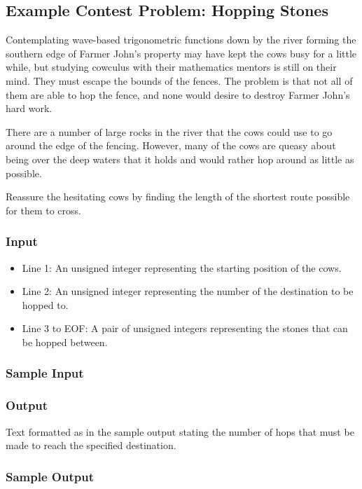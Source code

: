 \subsection{Example Contest Problem: Hopping Stones}

Contemplating wave-based trigonometric functions down by the river forming the southern edge of Farmer John's property may have kept the cows busy for a little while, but studying cowculus with their mathematics mentors is still on their mind.
They must escape the bounds of the fences.
The problem is that not all of them are able to hop the fence, and none would desire to destroy Farmer John's hard work.

There are a number of large rocks in the river that the cows could use to go around the edge of the fencing.
However, many of the cows are queasy about being over the deep waters that it holds and would rather hop around as little as possible.

Reassure the hesitating cows by finding the length of the shortest route possible for them to cross.

\subsubsection{Input}
\begin{itemize}
	\item Line 1: An unsigned integer representing the starting position of the cows.
	\item Line 2: An unsigned integer representing the number of the destination to be hopped to.
	\item Line 3 to EOF: A pair of unsigned integers representing the stones that can be hopped between.
\end{itemize}

\subsubsection{Sample Input}

\subsubsection{Output}
Text formatted as in the sample output stating the number of hops that must be made to reach the specified destination.

\subsubsection{Sample Output}


